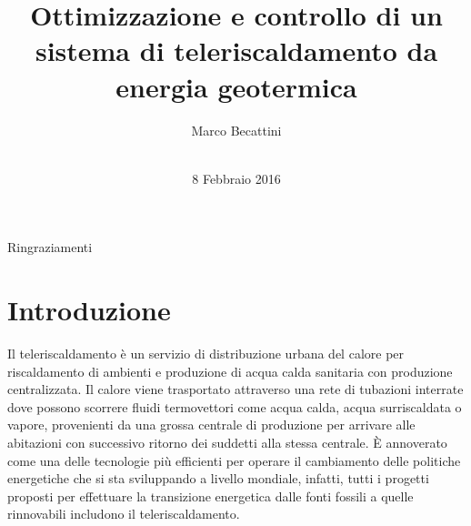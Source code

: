 \documentclass[laurea,oneside,11pt]{USiena_tesiLM}
\title{Ottimizzazione e controllo di un sistema di teleriscaldamento da energia geotermica}
\author{Marco Becattini\\~\\}
\date{8 Febbraio 2016}
\newcommand{\facciatabianca}{\newpage\shipout\null\stepcounter{page}}
\begin{document}
\maketitle

\facciatabianca


%
%
\begin{abstract}          %
  
\end{abstract}             %

\frontmatter
Ringraziamenti            %
\
%
\tableofcontents            %
%


\mainmatter

\chapter*{Introduzione}

Il teleriscaldamento è un  servizio  di  distribuzione  urbana  del calore per  riscaldamento di ambienti e produzione di acqua calda sanitaria con produzione centralizzata. Il calore viene trasportato attraverso una rete di tubazioni interrate dove possono scorrere  fluidi termovettori come acqua calda, acqua surriscaldata o vapore, provenienti da una grossa centrale di produzione per arrivare alle abitazioni con successivo ritorno dei suddetti alla stessa centrale. È annoverato come una delle tecnologie più efficienti per operare il cambiamento delle politiche energetiche che si sta sviluppando a livello mondiale, infatti, tutti i progetti proposti per effettuare la transizione energetica dalle fonti fossili a quelle rinnovabili includono il teleriscaldamento. 
\end{document}
